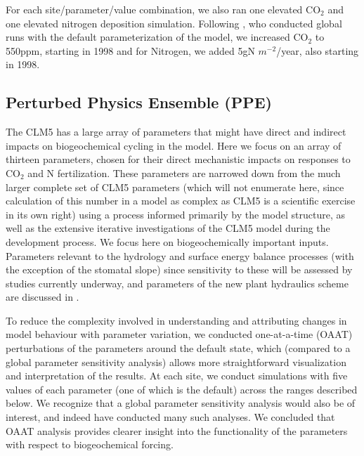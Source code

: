 \documentclass[draft,linenumbers]{agujournal}
\begin{document}
For each site/parameter/value combination, we also ran one elevated CO$_{2}$ and one elevated nitrogen deposition simulation. Following \cite{wieder2019}, who conducted global runs with the default parameterization of the model, we increased CO$_{2}$ to 550ppm, starting in 1998 and for Nitrogen, we added 5gN $m^{-2}$/year, also starting in 1998. 

\subsection{Perturbed Physics Ensemble (PPE)}
The CLM5 has a large array of parameters that might have direct and indirect impacts on biogeochemical cycling in the model.  Here we focus on an array of thirteen parameters, chosen for their direct mechanistic impacts on responses to CO$_{2}$ and N fertilization. These parameters are narrowed down from the much larger complete set of CLM5 parameters (which will not enumerate here, since calculation of this number in a model as complex as CLM5 is a scientific exercise in its own right) using a process informed primarily by the model structure, as well as the extensive iterative investigations of the CLM5 model during the development process.  We focus here on biogeochemically important inputs. Parameters relevant to the hydrology and surface energy balance processes (with the exception of the stomatal slope) since sensitivity to these will be assessed by studies currently underway, and parameters of the new plant hydraulics scheme are discussed in \cite{kennedy2019}.

To reduce the complexity involved in understanding and attributing changes in model behaviour with parameter variation, we conducted one-at-a-time (OAAT) perturbations of the parameters around the default state, which (compared to a global parameter sensitivity analysis) allows more straightforward visualization and interpretation of the results.  At each site, we conduct simulations with five values of each parameter (one of which is the default) across the ranges described below. We recognize that a global parameter sensitivity analysis would also be of interest, and indeed have conducted many such analyses. We concluded that OAAT analysis provides clearer insight into the functionality of the parameters with respect to biogeochemical forcing. 
\end{document}
